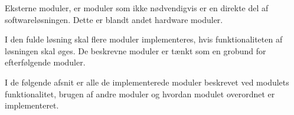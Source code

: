 Eksterne moduler, er moduler som ikke nødvendigvis er en direkte del af softwareløsningen. Dette er blandt andet hardware moduler.

I den fulde løsning skal flere moduler implementeres, hvis funktionaliteten af løsningen skal øges. De beskrevne moduler er tænkt som en grobund for efterfølgende moduler.

I de følgende afsnit er alle de implementerede moduler beskrevet ved modulets funktionalitet, brugen af andre moduler og hvordan modulet overordnet er implementeret.









